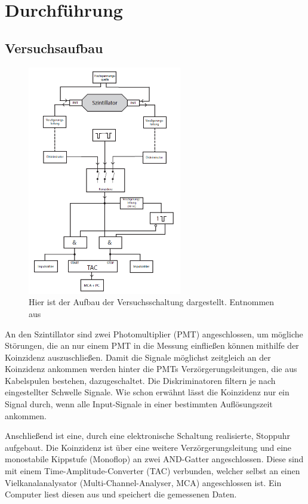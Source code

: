 \newpage
\section{Durchführung}
    \subsection{Versuchsaufbau}
        \begin{figure}[h]
          \centering
          \includegraphics[width = 0.6\textwidth]{pictures/Aufbau.png}
          \caption{Hier ist der Aufbau der Versuchsschaltung dargestellt. Entnommen aus \cite{tu_dortmund_versuchsanleitung_2021-1}}
          \label{fig:Aufbau}
        \end{figure}

        \FloatBarrier

        An den Szintillator sind zwei Photomultiplier (PMT) angeschlossen, um mögliche Störungen, die an nur einem PMT in die Messung einfließen können mithilfe der Koinzidenz auszuschließen.
        Damit die Signale möglichst zeitgleich an der Koinzidenz ankommen werden hinter die PMTs Verzörgerungsleitungen, die aus Kabelspulen bestehen, dazugeschaltet.
        Die Diskriminatoren filtern je nach eingestellter Schwelle Signale.
        Wie schon erwähnt lässt die Koinzidenz nur ein Signal durch, wenn alle Input-Signale in einer bestimmten Auflösungszeit ankommen.

        Anschließend ist eine, durch eine elektronische Schaltung realisierte, Stoppuhr aufgebaut. Die Koinzidenz ist über eine weitere Verzörgerungsleitung und eine monostabile Kippstufe (Monoflop) an zwei AND-Gatter angeschlossen. Diese sind mit einem Time-Amplitude-Converter (TAC) verbunden, welcher selbst an einen Vielkanalanalysator (Multi-Channel-Analyser, MCA) angeschlossen ist. Ein Computer liest diesen aus und speichert die gemessenen Daten.

